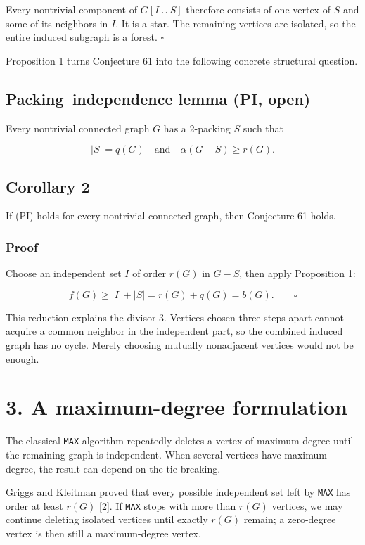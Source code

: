\documentclass[
  11pt,
  letterpaper,
]{article}
\begin{document}
Every nontrivial component of \(G[I\cup S]\) therefore consists of one
vertex of \(S\) and some of its neighbors in \(I\). It is a star. The
remaining vertices are isolated, so the entire induced subgraph is a
forest. \(\square\)

Proposition 1 turns Conjecture 61 into the following concrete structural
question.

\subsection{Packing--independence lemma (PI,
open)}\label{packingindependence-lemma-pi-open}

Every nontrivial connected graph \(G\) has a 2-packing \(S\) such that

\[
|S|=q(G)
\quad\text{and}\quad
\alpha(G-S)\ge r(G).
\tag{PI}
\]

\subsection{Corollary 2}\label{corollary-2}

If (PI) holds for every nontrivial connected graph, then Conjecture 61
holds.

\subsubsection{Proof}\label{proof-1}

Choose an independent set \(I\) of order \(r(G)\) in \(G-S\), then apply
Proposition 1:

\[
f(G)\ge |I|+|S|=r(G)+q(G)=b(G).
\qquad\square
\]

This reduction explains the divisor \(3\). Vertices chosen three steps
apart cannot acquire a common neighbor in the independent part, so the
combined induced graph has no cycle. Merely choosing mutually
nonadjacent vertices would not be enough.

\section{3. A maximum-degree
formulation}\label{a-maximum-degree-formulation}

The classical \texttt{MAX} algorithm repeatedly deletes a vertex of
maximum degree until the remaining graph is independent. When several
vertices have maximum degree, the result can depend on the tie-breaking.

Griggs and Kleitman proved that every possible independent set left by
\texttt{MAX} has order at least \(r(G)\) {[}2{]}. If \texttt{MAX} stops
with more than \(r(G)\) vertices, we may continue deleting isolated
vertices until exactly \(r(G)\) remain; a zero-degree vertex is then
still a maximum-degree vertex.
\end{document}
